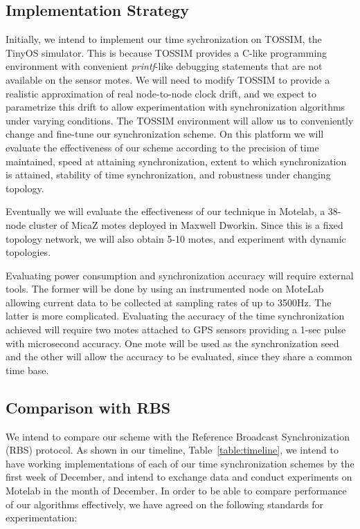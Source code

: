 \documentclass[8pt,twocolumn]{article}
\begin{document}
\subsection{Implementation Strategy} Initially, we intend to implement our
time sychronization on TOSSIM, the TinyOS simulator.  This is because TOSSIM
provides a C-like programming environment with convenient \emph{printf}-like
debugging statements that are not available on the sensor motes.  We will
need to modify TOSSIM to provide a realistic approximation of real
node-to-node clock drift, and we expect to parametrize this drift to allow
experimentation with synchronization algorithms under varying conditions.
The TOSSIM environment will allow us to conveniently change and fine-tune our
synchronization scheme.  On this platform we will evaluate the effectiveness
of our scheme according to the precision of time maintained, speed at
attaining synchronization, extent to which synchronization is attained,
stability of time synchronization, and robustness under changing topology.

Eventually we will evaluate the effectiveness of our technique in Motelab, a
38-node cluster of MicaZ motes deployed in Maxwell Dworkin.  Since this is a
fixed topology network, we will also obtain 5-10 motes, and experiment with
dynamic topologies.  

Evaluating power consumption and synchronization accuracy will require
external tools.  The former will be done by using an instrumented node on
MoteLab allowing current data to be collected at sampling rates of up to
3500Hz.  The latter is more complicated.  Evaluating the accuracy of the time
synchronization achieved will require two motes attached to GPS sensors
providing a 1-sec pulse with microsecond accuracy.  One mote will be used as
the synchronization seed and the other will allow the accuracy to be
evaluated, since they share a common time base.

\subsection{Comparison with RBS} We intend to compare our scheme with the
Reference Broadcast Synchronization (RBS) protocol. As shown in our timeline,
Table~\ref{table:timeline}, we intend to have working implementations of each
of our time synchronization schemes by the first week of December, and intend
to exchange data and conduct experiments on Motelab in the month of December.
In order to be able to compare performance of our algorithms effectively, we
have agreed on the following standards for experimentation:
\end{document}
